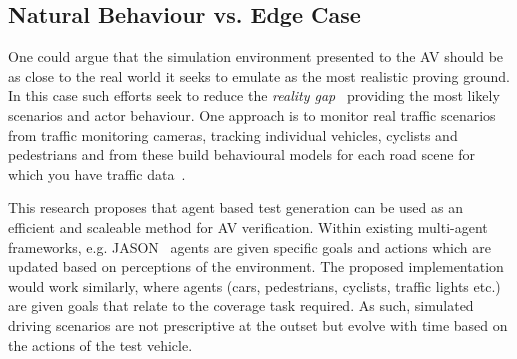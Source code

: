 \documentclass[letterpaper, 10 pt, journal, twoside]{IEEEtran}
\begin{document}


\subsection{Natural Behaviour vs. Edge Case}
One could argue that the simulation environment presented to the AV should be as close to the real world it seeks to emulate as the most realistic proving ground. In this case such efforts seek to reduce the \textit{reality gap}~\cite{Jakobi1995} providing the most likely scenarios and actor behaviour. One approach is to monitor real traffic scenarios from traffic monitoring cameras, tracking individual vehicles, cyclists and pedestrians and from these build behavioural models for each road scene for which you have traffic data~\cite{behbahani2019learning}. 


This research proposes that agent based test generation can be used as an efficient and scaleable method for AV verification. Within existing multi-agent frameworks, e.g. JASON~\cite{bordini2005jason} agents are given specific goals and actions which are updated based on perceptions of the environment. The proposed implementation would work similarly, where agents (cars, pedestrians, cyclists, traffic lights etc.) are given goals that relate to the coverage task required. As such, simulated driving scenarios are not prescriptive at the outset but evolve with time based on the actions of the test vehicle.




\end{document}

